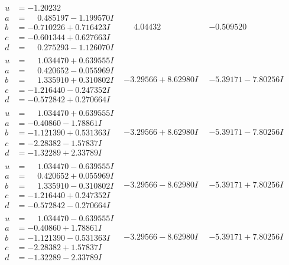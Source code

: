 \documentclass[1p]{elsarticle_modified}
\theoremstyle{definition}
\begin{document}
$$\begin{array}{c|c|c}
\begin{aligned}
u &= -1.20232\phantom{ +0.000000I} \\
a &= \phantom{-}0.485197 - 1.199570 I \\
b &= -0.710226 + 0.716423 I \\
c &= -0.601344 + 0.627663 I \\
d &= \phantom{-}0.275293 - 1.126070 I\end{aligned}
 & \phantom{-}4.04432\phantom{ +0.000000I} & -0.509520\phantom{ +0.000000I} \\ \hline\begin{aligned}
u &= \phantom{-}1.034470 + 0.639555 I \\
a &= \phantom{-}0.420652 - 0.055969 I \\
b &= \phantom{-}1.335910 + 0.310802 I \\
c &= -1.216440 - 0.247352 I \\
d &= -0.572842 + 0.270664 I\end{aligned}
 & -3.29566 + 8.62980 I & -5.39171 - 7.80256 I \\ \hline\begin{aligned}
u &= \phantom{-}1.034470 + 0.639555 I \\
a &= -0.40860 - 1.78861 I \\
b &= -1.121390 + 0.531363 I \\
c &= -2.28382 - 1.57837 I \\
d &= -1.32289 + 2.33789 I\end{aligned}
 & -3.29566 + 8.62980 I & -5.39171 - 7.80256 I \\ \hline\begin{aligned}
u &= \phantom{-}1.034470 - 0.639555 I \\
a &= \phantom{-}0.420652 + 0.055969 I \\
b &= \phantom{-}1.335910 - 0.310802 I \\
c &= -1.216440 + 0.247352 I \\
d &= -0.572842 - 0.270664 I\end{aligned}
 & -3.29566 - 8.62980 I & -5.39171 + 7.80256 I \\ \hline\begin{aligned}
u &= \phantom{-}1.034470 - 0.639555 I \\
a &= -0.40860 + 1.78861 I \\
b &= -1.121390 - 0.531363 I \\
c &= -2.28382 + 1.57837 I \\
d &= -1.32289 - 2.33789 I\end{aligned}
 & -3.29566 - 8.62980 I & -5.39171 + 7.80256 I\\

\end{array}$$
\end{document}

